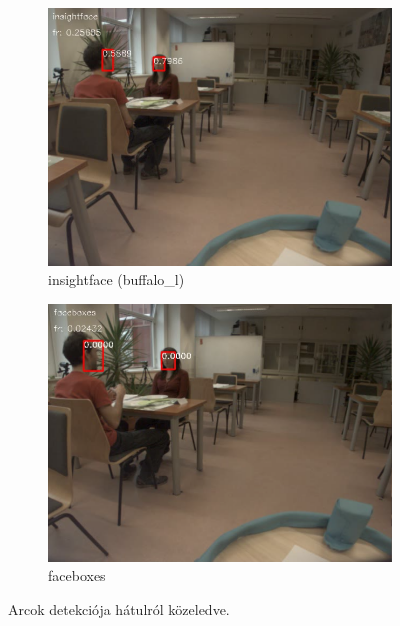 \begin{figure}
    \centering
    \begin{subfigure}[b]{0.45\linewidth}
        \includegraphics[width=\linewidth]{figures/video_comparison/insightface_superiority/video_comparison_from_behind_insightface.png}
        \caption{insightface (buffalo\_l)}
    \end{subfigure}
    \begin{subfigure}[b]{0.45\linewidth}
        \includegraphics[width=\linewidth]{figures/video_comparison/insightface_superiority/video_comparison_from_behind_faceboxes.png}
        \caption{faceboxes}
    \end{subfigure}
    \caption{Arcok detekciója hátulról közeledve.}
    \label{fig:video_comparison_faces_from_behind}
\end{figure}

